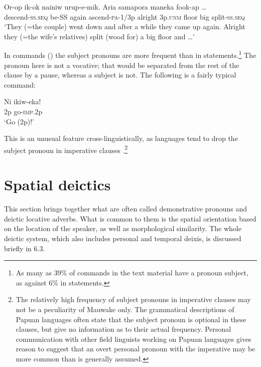 \ea%
\label{ex:3:x1922}
\gll Or-op ik-ok nainiw urup-e-mik. Aria  samapora maneka fook-ap {\dots}\\
descend-\textsc{ss}.\textsc{seq} be-SS again ascend-\textsc{pa}-1/3p alright 3p.\textsc{unm} floor big split-\textsc{ss}.\textsc{seq} \\
\glt`They (=the couple) went down and after a while they came up again. Alright they (=the wife's relatives) split (wood for) a big floor and {\dots}'
\z

In commands () the subject pronouns are more frequent than in statements.\footnote{As many as 39\% of commands in the text material have a pronoun subject, as against 6\% in statements.} The pronoun here is not a vocative; that would be separated from the rest of the clause by a pause, whereas a subject is not. The following is a fairly typical command:

\ea%
\label{ex:3:x685}
\gll Ni ikiw-eka! \\
2p go-\textsc{imp}.2p\\
\glt`Go (2p)!'
\z

This is an unusual feature cross-linguistically, as languages tend to drop the subject pronoun in imperative clauses \citep[80]{Givon1979}.\footnote{The relatively high frequency of subject pronouns in imperative clauses may not be a peculiarity of Mauwake only. The grammatical descriptions of Papuan languages often state that the subject pronoun is optional in these clauses, but give no information as to their actual frequency. Personal communication with other field linguists working on Papuan languages gives reason to suggest that an overt personal pronoun with the imperative may be more common than is generally assumed.} 

\section{Spatial deictics}\label{sec:3:6}
{}
This section brings together what are often called demonstrative pronouns and deictic locative adverbs. What is common to them is the spatial orientation based on the location of the speaker, as well as morphological similarity. The whole deictic system, which also includes personal and temporal deixis, is discussed briefly in 6.3. 

